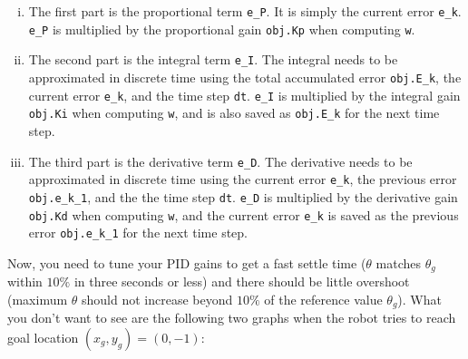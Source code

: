 \documentclass[10pt]{article}
\begin{document}
\begin{enumerate}
  \begin{enumerate}[(i)]
    \item The first part is the proportional term \texttt{e\_P}. It is simply the current error \texttt{e\_k}. \texttt{e\_P} is multiplied by the proportional gain \texttt{obj.Kp} when computing \texttt{w}.
    \item The second part is the integral term \texttt{e\_I}. The integral needs to be approximated in discrete time using the total accumulated error \texttt{obj.E\_k}, the current error \texttt{e\_k}, and the time step \texttt{dt}. \texttt{e\_I} is multiplied by the integral gain \texttt{obj.Ki} when computing \texttt{w}, and is also saved as \texttt{obj.E\_k} for the next time step.
    \item The third part is the derivative term \texttt{e\_D}. The derivative needs to be approximated in discrete time using the current error \texttt{e\_k}, the previous error \texttt{obj.e\_k\_1}, and the the time step \texttt{dt}. \texttt{e\_D} is multiplied by the derivative gain \texttt{obj.Kd} when computing \texttt{w}, and the current error \texttt{e\_k} is saved as the previous error \texttt{obj.e\_k\_1} for the next time step.
  \end{enumerate}
  
  Now, you need to tune your PID gains to get a fast settle time ($\theta$ matches $\theta_g$ within $10\%$ in three seconds or less) and there should be little overshoot (maximum $\theta$ should not increase beyond $10\%$ of the reference value $\theta_g$). What you don't want to see are the following two graphs when the robot tries to reach goal location $(x_g,y_g)=(0,-1)$:
  

\end{enumerate}
\end{document}
